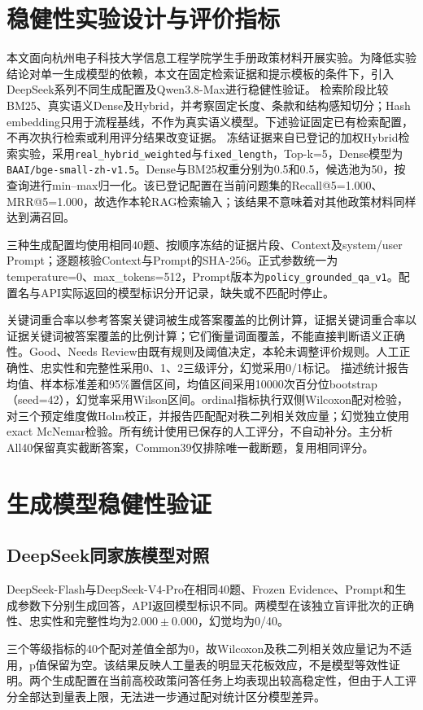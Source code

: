 \providecommand{\CrossModelAssetRoot}{docs/thesis}
\section{稳健性实验设计与评价指标}
\label{sec:cm-design}
本文面向杭州电子科技大学信息工程学院学生手册政策材料开展实验。为降低实验结论对单一生成模型的依赖，本文在固定检索证据和提示模板的条件下，引入DeepSeek系列不同生成配置及Qwen3.8-Max进行稳健性验证。
检索阶段比较BM25、真实语义Dense及Hybrid，并考察固定长度、条款和结构感知切分；Hash embedding只用于流程基线，不作为真实语义模型。下述验证固定已有检索配置，不再次执行检索或利用评分结果改变证据。
冻结证据来自已登记的加权Hybrid检索实验，采用\texttt{real\_hybrid\_weighted}与\texttt{fixed\_length}，Top-k=5，Dense模型为\texttt{BAAI/bge-small-zh-v1.5}。Dense与BM25权重分别为0.5和0.5，候选池为50，按查询进行min--max归一化。该已登记配置在当前问题集的Recall@5=1.000、MRR@5=1.000，故选作本轮RAG检索输入；该结果不意味着对其他政策材料同样达到满召回。

三种生成配置均使用相同40题、按顺序冻结的证据片段、Context及system/user Prompt；逐题核验Context与Prompt的SHA-256。正式参数统一为temperature=0、max\_tokens=512，Prompt版本为\texttt{policy\_grounded\_qa\_v1}。配置名与API实际返回的模型标识分开记录，缺失或不匹配时停止。


关键词重合率以参考答案关键词被生成答案覆盖的比例计算，证据关键词重合率以证据关键词被答案覆盖的比例计算；它们衡量词面覆盖，不能直接判断语义正确性。Good、Needs Review由既有规则及阈值决定，本轮未调整评价规则。人工正确性、忠实性和完整性采用0、1、2三级评分，幻觉采用0/1标记。
描述统计报告均值、样本标准差和95\%置信区间，均值区间采用10000次百分位bootstrap（seed=42），幻觉率采用Wilson区间。ordinal指标执行双侧Wilcoxon配对检验，对三个预定维度做Holm校正，并报告匹配配对秩二列相关效应量；幻觉独立使用exact McNemar检验。所有统计使用已保存的人工评分，不自动补分。主分析All40保留真实截断答案，Common39仅排除唯一截断题，复用相同评分。

\section{生成模型稳健性验证}
\label{sec:cm-results}
\subsection{DeepSeek同家族模型对照}
DeepSeek-Flash与DeepSeek-V4-Pro在相同40题、Frozen Evidence、Prompt和生成参数下分别生成回答，API返回模型标识不同。两模型在该独立盲评批次的正确性、忠实性和完整性均为$2.000\pm0.000$，幻觉均为0/40。

三个等级指标的40个配对差值全部为0，故Wilcoxon及秩二列相关效应量记为不适用，p值保留为空。该结果反映人工量表的明显天花板效应，不是模型等效性证明。两个生成配置在当前高校政策问答任务上均表现出较高稳定性，但由于人工评分全部达到量表上限，无法进一步通过配对统计区分模型差异。


